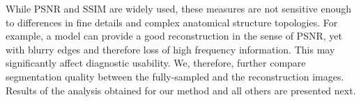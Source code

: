 \documentclass[10pt,journal,compsoc]{IEEEtran}
\begin{document}

%		

While PSNR and SSIM are widely used, these measures are not sensitive enough to differences in fine details and complex anatomical structure topologies. For example, a model can provide a good reconstruction in the sense of PSNR, yet with blurry edges and therefore loss of high frequency information. This may significantly affect diagnostic usability. We, therefore, further compare segmentation quality between the fully-sampled and the reconstruction images. Results of the analysis obtained for our method and all others are presented next.
\end{document}
